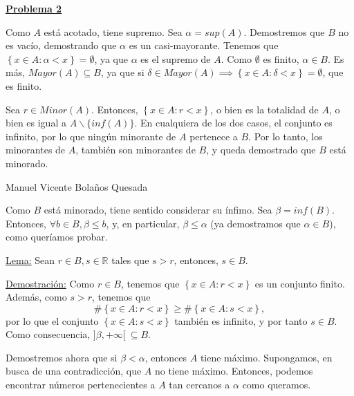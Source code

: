 \documentclass[10pt,a4paper]{article}
\begin{document}
	\begin{flushleft}
		\textbf{\underline{Problema 2}}
	\end{flushleft}
	
	Como $A$ está acotado, tiene supremo. Sea $\alpha = sup(A)$. Demostremos que $B$ no es vacío, demostrando que $\alpha$ es un casi-mayorante. Tenemos que $\left\lbrace x \in A : \alpha < x \right\rbrace  = \emptyset$, ya que $\alpha$ es el supremo de $A$. Como $\emptyset$ es finito, $\alpha \in B$. Es más, $Mayor(A) \subseteq B$, ya que si $\delta \in Mayor(A) \implies \left\lbrace x \in A : \delta < x \right\rbrace  = \emptyset$, que es finito. \newline
	
	Sea $r \in Minor(A)$. Entonces, $\left\lbrace x \in A : r < x \right\rbrace$, o bien es la totalidad de $A$, o bien es igual a $A \backslash \{inf(A)\}$. En cualquiera de los dos casos, el conjunto es infinito, por lo que ningún minorante de $A$ pertenece a $B$. Por lo tanto, los minorantes de $A$, también son minorantes de $B$, y queda demostrado que $B$ está minorado. \newpage
	
	\begin{flushleft}
		Manuel Vicente Bolaños Quesada	\newline 
	\end{flushleft}	
	

	
	Como $B$ está minorado, tiene sentido considerar su ínfimo. Sea $\beta = inf(B)$. Entonces, $\forall b \in B, \beta \leq b$, y, en particular, $\beta \leq \alpha$ (ya demostramos que $\alpha \in B$), como queríamos probar. \newline
	
	\underline{Lema:} Sean $r \in B, s \in \mathbb{R}$ tales que $s > r$, entonces, $s \in B$.
	
	\underline{Demostración:} Como $r \in B$, tenemos que $\left\lbrace x \in A : r < x \right\rbrace$ es un conjunto finito. Además, como $s > r$, tenemos que $$\#\left\lbrace x \in A : r < x \right\rbrace \geq \#\left\lbrace x \in A : s < x \right\rbrace ,$$ por lo que el conjunto $\left\lbrace x \in A : s < x \right\rbrace$ también es infinito, y por tanto $s \in B$. Como consecuencia, $] \beta, + \infty [ ~ \subseteq B$. \newline
	\newline
	
	Demostremos ahora que si $\beta < \alpha$, entonces $A$ tiene máximo. Supongamos, en busca de una contradicción, que $A$ no tiene máximo. Entonces, podemos encontrar números pertenecientes a $A$ tan cercanos a $\alpha$ como queramos. \newline
	
\end{document}
